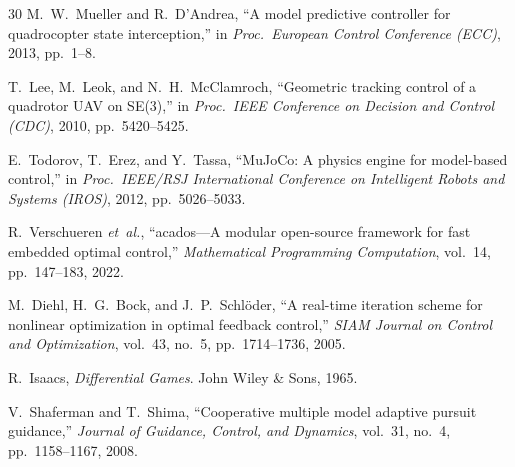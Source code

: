\documentclass[lettersize,journal]{IEEEtran}
\theoremstyle{definition}
\theoremstyle{remark}
\begin{document}
\begin{thebibliography}{30}
M.~W.~Mueller and R.~D'Andrea,
``A model predictive controller for quadrocopter state interception,''
in \emph{Proc.\ European Control Conference (ECC)}, 2013, pp.~1--8.

T.~Lee, M.~Leok, and N.~H.~McClamroch,
``Geometric tracking control of a quadrotor UAV on SE(3),''
in \emph{Proc.\ IEEE Conference on Decision and Control (CDC)},
2010, pp.~5420--5425.

E.~Todorov, T.~Erez, and Y.~Tassa,
``MuJoCo: A physics engine for model-based control,''
in \emph{Proc.\ IEEE/RSJ International Conference on Intelligent
  Robots and Systems (IROS)}, 2012, pp.~5026--5033.

R.~Verschueren \emph{et~al.},
``acados---A modular open-source framework for fast embedded
  optimal control,''
\emph{Mathematical Programming Computation},
vol.~14, pp.~147--183, 2022.

M.~Diehl, H.~G.~Bock, and J.~P.~Schl\"{o}der,
``A real-time iteration scheme for nonlinear optimization in optimal
  feedback control,''
\emph{SIAM Journal on Control and Optimization},
vol.~43, no.~5, pp.~1714--1736, 2005.

R.~Isaacs,
\emph{Differential Games}.
John Wiley \& Sons, 1965.

V.~Shaferman and T.~Shima,
``Cooperative multiple model adaptive pursuit guidance,''
\emph{Journal of Guidance, Control, and Dynamics},
vol.~31, no.~4, pp.~1158--1167, 2008.

\end{thebibliography}

\vfill
\end{document}
